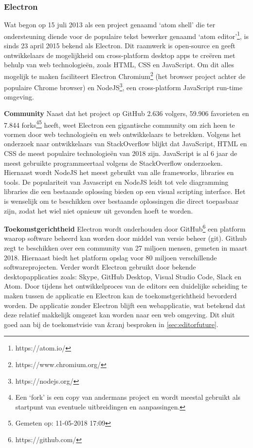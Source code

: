 \subsubsection{Electron}
Wat begon op 15 juli 2013 als een project genaamd ‘atom shell’\cite{StartOfAtomShell} die ter ondersteuning diende voor de populaire tekst bewerker genaamd ‘atom editor’\footnote{https://atom.io/}, is sinds 23 april 2015 bekend als Electron\cite{AtomShellIsNowElectron}. Dit raamwerk is open-source en geeft ontwikkelaars de mogelijkheid om cross-platform desktop apps te creëren met behulp van web technologieën, zoals HTML, CSS en JavaScript. Om dit alles mogelijk te maken faciliteert Electron Chromium\footnote{https://www.chromium.org/} (het browser project achter de populaire Chrome browser) en NodeJS\footnote{https://nodejs.org/}, een cross-platform JavaScript run-time omgeving. 

\textbf{Community}
Naast dat het project op GitHub 2.636 volgers, 59.906 favorieten en 7.844 forks\footnote{Een ‘fork’ is een copy van andermans project en wordt meestal gebruikt als startpunt van eventuele uitbreidingen en aanpassingen.}\footnote{Gemeten op: 11-05-2018 17:09} \cite{GithubElectron} heeft, weet Electron een gigantische community om zich heen te vormen door web technologieën en web ontwikkelaars te betrekken. Volgens het onderzoek naar ontwikkelaars van StackOverflow blijkt dat JavaScript, HTML en CSS de meest populaire technologieën van 2018 zijn\cite{StackOverflowAnnualSurvey2018}. JavaScript is al 6 jaar de meest gebruikte programmeertaal volgens de StackOverflow onderzoeken. Hiernaast wordt NodeJS het meest gebruikt van alle frameworks, libraries en tools\cite{StackOverflowAnnualSurvey2018}.
De populariteit van Javascript en NodeJS leidt tot vele diagramming libraries die een bestaande oplossing bieden op een visual scripting interface. Het is wenselijk om te beschikken over bestaande oplossingen die direct toepasbaar zijn, zodat het wiel niet opnieuw uit gevonden hoeft te worden.

\textbf{Toekomstgerichtheid}
Electron wordt onderhouden door GitHub\footnote{https://github.com/} een platform waarop software beheerd kan worden door middel van versie beheer (git). Github zegt te beschikken over een community van 27 miljoen mensen, gemeten in maart 2018\cite{GithubAbout}. Hiernaast biedt het platform opslag voor 80 miljoen verschillende softwareprojecten.
Verder wordt Electron gebruikt door bekende desktopapplicaties zoals: Skype, GitHub Desktop, Visual Studio Code, Slack en Atom\cite{ElectronJS}.
Door tijdens het ontwikkelproces van de editors een duidelijke scheiding te maken tussen de applicatie en Electron kan de toekomstgerichtheid bevorderd worden. De applicatie zonder Electron blijft een webapplicatie, wat betekend dat deze relatief makkelijk omgezet kan worden naar een web omgeving. Dit sluit goed aan bij de toekomstvisie van \&ranj besproken in \autoref{sec:editorfuture}.

